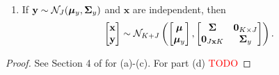 \begin{theorem}
\begin{enumerate}
        \item
            If $\mathbf{y} \sim \mathcal{N}_J( \boldsymbol{\mu}_y, \boldsymbol{\Sigma}_{y})$ and $\mathbf{x}$ are independent, then
            \begin{equation*}
                \begin{bmatrix}
                    \mathbf{x} \\ \mathbf{y}
                \end{bmatrix} \sim \mathcal{N}_{K + J} \left(
                \begin{bmatrix}
                    \boldsymbol{\mu} \\ \boldsymbol{\mu}_{y}
                \end{bmatrix},
                \begin{bmatrix}
                    \boldsymbol{\Sigma} & \mathbf{0}_{K \times J} \\
                    \mathbf{0}_{J \mathbf{x} K} & \boldsymbol{\Sigma}_y
                \end{bmatrix}\right).
            \end{equation*}
    \end{enumerate}
\end{theorem}
\begin{proof}
    See Section 4 of \cite{murphy2012} for (a)-(c). For part (d) \textcolor{red}{TODO}
\end{proof}
